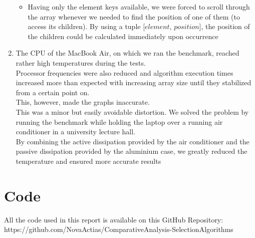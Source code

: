 \documentclass{article}
\begin{document}
\begin{enumerate}
\begin{itemize}
        \item Having only the element keys available, we were forced to scroll through the array whenever we needed to find the position of one of them (to access its children). By using a tuple [$element$, $position$], the position of the children could be calculated immediately upon occurrence
    \end{itemize}
    \item The CPU of the MacBook Air, on which we ran the benchmark, reached rather high temperatures during the tests.\\
    Processor frequencies were also reduced and algorithm execution times increased more than expected with increasing array size until they stabilized from a certain point on.\\
    This, however, made the graphs inaccurate.\\
    This was a minor but easily avoidable distortion. We solved the problem by running the benchmark while holding the laptop over a running air conditioner in a university lecture hall.\\
    By combining the active dissipation provided by the air conditioner and the passive dissipation provided by the aluminium case, we greatly reduced the temperature and ensured more accurate results
\end{enumerate}

\section{Code}
All the code used in this report is available on this GitHub Repository: \\
https://github.com/NovaActias/ComparativeAnalysis-SelectionAlgorithms
\end{document}
